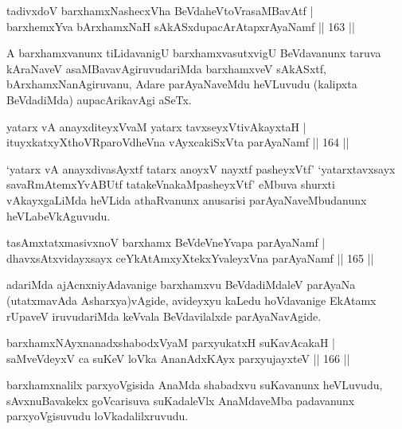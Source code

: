 \begin{shl}
tadivxdoV barxhamxNashecxVha BeVdaheVtoVrasaMBavAtf |\\
barxhemxYva bArxhamxNaH sAkASxdupacArAtapxrAyaNamf \hfill || 163 ||
\end{shl}

\begin{artha}
A barxhamxvanunx tiLidavanigU barxhamxvasutxvigU BeVdavanunx taruva kAraNaveV asaMBavavAgiruvudariMda barxhamxveV sAkASxtf, bArxhamxNanAgiruvanu, Adare parAyaNaveMdu heVLuvudu (kalipxta BeVdadiMda) aupacArikavAgi aSeTx.
\end{artha}

\begin{shl}
yatarx vA anayxditeyxVvaM yatarx tavxseyxVtivAkayxtaH |\\
ituyxkatxyXthoVRparoVdheVna vAyxcakiSxVta parAyaNamf \hfill || 164 ||
\end{shl}

\begin{artha}%
`yatarx vA anayxdivasAyxtf tatarx anoyxV nayxtf pasheyxVtf' `yatarxtavxsayx savaRmAtemxYvABUtf tatakeVnakaMpasheyxVtf' eMbuva shurxti vAkayxgaLiMda heVLida athaRvanunx anusarisi parAyaNaveMbudanunx heVLabeVkAguvudu.
\end{artha}

\begin{shl}
tasAmxtatxmasivxnoV barxhamx BeVdeVneYvapa parAyaNamf |\\
dhavxsAtxvidayxsayx ceYkAtAmxyXtekxYvaleyxVna parAyaNamf \hfill || 165 ||
\end{shl}

\begin{artha}
adariMda ajAcnxniyAdavanige barxhamxvu BeVdadiMdaleV parAyaNa (utatxmavAda Asharxya)vAgide, avideyxyu kaLedu hoVdavanige EkAtamx rUpaveV iruvudariMda keVvala BeVdavilalxde parAyaNavAgide.
\end{artha}

\begin{shl}
barxhamxNAyxnanadxshabodxV\s yaM parxyukatxH suKavAcakaH |\\
saMveVdeyxV ca suKeV loVka AnanAdxKAyx parxyujayxteV \hfill || 166 ||
\end{shl}

\begin{artha}
barxhamxnalilx parxyoVgisida AnaMda shabadxvu suKavanunx heVLuvudu, sAvxnuBavakekx goVcarisuva suKadaleVlx AnaMdaveMba padavanunx parxyoVgisuvudu loVkadalilxruvudu.
\end{artha}

